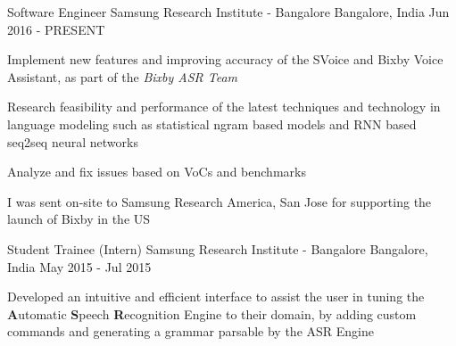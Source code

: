 

\begin{cventries}

  \cventry
    {Software Engineer} %
    {Samsung Research Institute - Bangalore} %
    {Bangalore, India} %
    {Jun 2016 - PRESENT} %
    {
      \begin{cvitems}
      \item{Implement new features and improving accuracy of the SVoice and Bixby Voice Assistant, as part of the \textit{Bixby ASR Team}}
      \item{Research feasibility and performance of the latest techniques and technology in language modeling such as statistical ngram based models and RNN based seq2seq neural networks}
      \item{Analyze and fix issues based on VoCs and benchmarks}
      \item{I was sent on-site to Samsung Research America, San Jose for supporting the launch of Bixby in the US}
      \end{cvitems}
    }

  \cventry
    {Student Trainee (Intern)} %
    {Samsung Research Institute - Bangalore} %
    {Bangalore, India} %
    {May 2015 - Jul 2015} %
    {
      \begin{cvitems}
      \item{Developed an intuitive and efficient interface to assist the user in tuning the \textbf{A}utomatic  \textbf{S}peech \textbf{R}ecognition Engine to their domain, by adding custom commands and generating a grammar parsable by the ASR  Engine}
      \end{cvitems}
    }


\end{cventries}
